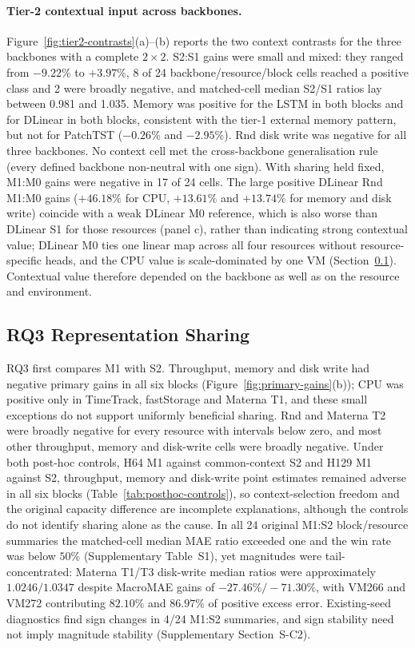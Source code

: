 \documentclass[5p,twocolumn]{elsarticle}
\begin{document}
\paragraph{Tier-2 contextual input across backbones.}
Figure~\ref{fig:tier2-contrasts}(a)--(b) reports the two context contrasts
for the three backbones with a complete $2\times2$. S2:S1 gains were small
and mixed: they ranged from $-9.22\%$ to $+3.97\%$, 8 of 24
backbone/resource/block cells reached a positive class and 2 were broadly
negative, and matched-cell median S2/S1 ratios lay between 0.981 and 1.035.
Memory was positive for the LSTM in both blocks and for DLinear in both
blocks, consistent with the tier-1 external memory pattern, but not for
PatchTST ($-0.26\%$ and $-2.95\%$). Rnd disk write was negative for all
three backbones. No context cell met the cross-backbone generalisation rule
(every defined backbone non-neutral with one sign). With sharing held fixed,
M1:M0 gains were negative in 17 of 24 cells. The large positive DLinear Rnd
M1:M0 gains ($+46.18\%$ for CPU, $+13.61\%$ and $+13.74\%$ for memory and disk
write) coincide with a weak DLinear M0 reference, which is also worse than
DLinear S1 for those resources (panel c), rather than indicating strong
contextual value; DLinear M0 ties one linear map across all four resources without
resource-specific heads, and the CPU value is scale-dominated by one VM
(Section~\ref{sec:results-rq2}). Contextual value therefore depended on the
backbone as well as on the resource and environment.

\subsection{RQ3 Representation Sharing}
\label{sec:results-rq2}

RQ3 first compares M1 with S2. Throughput, memory and disk write had negative
primary gains in all six blocks (Figure~\ref{fig:primary-gains}(b)); CPU was
positive only in TimeTrack, fastStorage and Materna T1, and these small
exceptions do not support uniformly beneficial sharing. Rnd and Materna T2
were broadly negative for every resource with intervals below zero, and most
other throughput, memory and disk-write cells were broadly negative. Under
both post-hoc controls, H64 M1 against common-context S2 and H129 M1 against
S2, throughput, memory and disk-write point estimates remained adverse in all
six blocks (Table~\ref{tab:posthoc-controls}), so
context-selection freedom and the original capacity difference are
incomplete explanations, although the controls do not identify sharing alone
as the cause. In all 24 original M1:S2 block/resource summaries the
matched-cell median MAE ratio exceeded one and the win rate was below $50\%$
(Supplementary Table~S1), yet magnitudes were tail-concentrated: Materna T1/T3
disk-write median ratios were approximately $1.0246/1.0347$ despite MacroMAE
gains of $-27.46\%/-71.30\%$, with VM266 and VM272 contributing $82.10\%$ and
$86.97\%$ of positive excess error. Existing-seed diagnostics find sign
changes in 4/24 M1:S2 summaries, and sign stability need not imply magnitude
stability (Supplementary Section~S-C2).
\end{document}
